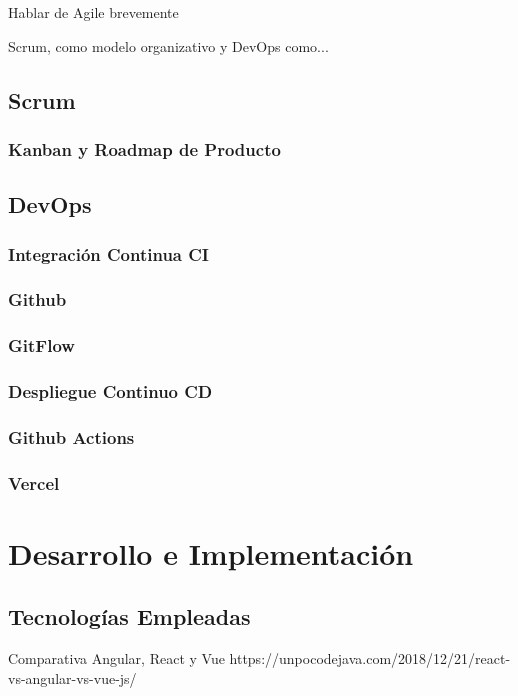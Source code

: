 \documentclass[12pt,twoside,titlepage]{report}
\begin{document}
Hablar de Agile brevemente

Scrum, como modelo organizativo  y DevOps como...

\subsection{Scrum}

\subsubsection{Kanban y Roadmap de Producto}

\subsection{DevOps}
\subsubsection{Integración Continua CI}
\subsubsection{Github}
\subsubsection{GitFlow}

\subsubsection{Despliegue Continuo CD}
\subsubsection{Github Actions}
\subsubsection{Vercel}

\section{Desarrollo e Implementación}

\subsection{Tecnologías Empleadas}

Comparativa Angular, React y Vue
https://unpocodejava.com/2018/12/21/react-vs-angular-vs-vue-js/
\end{document}

